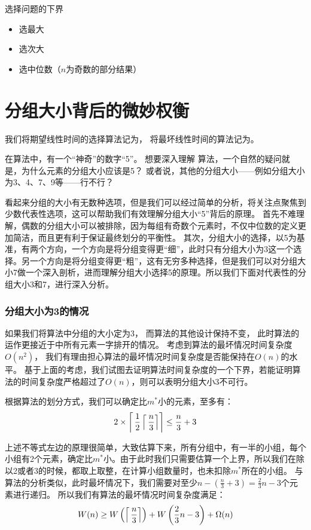 \nid 选择问题的下界
\begin{itemize}
    \item 选最大
    \item 选次大
    \item 选中位数（$n$为奇数的部分结果）
\end{itemize}

\section{分组大小背后的微妙权衡} \label{sec:group-size}

我们将期望线性时间的选择算法记为，
    将最坏线性时间的算法记为。

在算法中，有一个“神奇”的数字“5”。
想要深入理解 算法，一个自然的疑问就是，为什么元素的分组大小应该是5？
或者说，其他的分组大小——例如分组大小为3、4、7、9等——行不行？

看起来分组的大小有无数种选项，但是我们可以经过简单的分析，将关注点聚焦到少数代表性选项，这可以帮助我们有效理解分组大小“5”背后的原理。
首先不难理解，偶数的分组大小可以被排除，因为每组有奇数个元素时，不仅中位数的定义更加简洁，而且更有利于保证最终划分的平衡性。
其次，分组大小的选择，以5为基准，有两个方向，一个方向是将分组变得更“细”，此时只有分组大小为3这一个选择。另一个方向是将分组变得更“粗”，这有无穷多种选择，但是我们可以对分组大小7做一个深入剖析，进而理解分组大小选择5的原理。所以我们下面对代表性的分组大小3和7，进行深入分析。

\subsubsection{分组大小为3的情况}

如果我们将算法中分组的大小定为3，
    而算法的其他设计保持不变，
    此时算法的运作更接近于中所有元素一字排开的情况。
考虑到算法的最坏情况时间复杂度$O(n^2)$，
    我们有理由担心算法的最坏情况时间复杂度是否能保持在$O(n)$的水平。
基于上面的考虑，我们试图去证明算法时间复杂度的一个下界，若能证明算法的时间复杂度严格超过了$O(n)$，则可以表明分组大小3不可行。

根据算法的划分方式，我们可以确定比$m^*$小的元素，至多有：
\begin{align*}
    2 \times \left \lceil\, \frac{1}{2} \left \lceil\,\frac{n}{3} \right \rceil  \right \rceil \leq \frac{n}{3}+3
\end{align*}

\noindent 上述不等式左边的原理很简单，大致估算下来，所有分组中，有一半的小组，每个小组有2个元素，确定比$m^*$小。由于此时我们只需要估算一个上界，所以我们在除以2或者3的时候，都取上取整，在计算小组数量时，也未扣除$m^*$所在的小组。
%
与算法的分析类似，此时最坏情况下，我们需要对至少$n-(\frac{n}{3}+3) = \frac{2}{3}n-3$个元素进行递归。
所以我们有算法的最坏情况时间复杂度满足：
\begin{align*}
    W(n) \geq W\left(\left \lceil\,\frac{n}{3} \right \rceil\right) + W\left(\frac{2}{3}n-3\right) + \Omega(n)
\end{align*}

